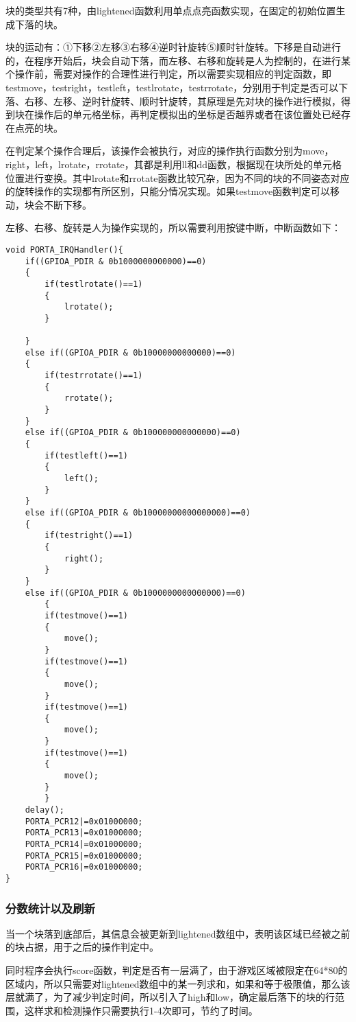 \documentclass[UTF8]{ctexart}
\begin{document}
块的类型共有7种，由lightened函数利用单点点亮函数实现，在固定的初始位置生成下落的块。

块的运动有：①下移②左移③右移④逆时针旋转⑤顺时针旋转。下移是自动进行的，在程序开始后，块会自动下落，而左移、右移和旋转是人为控制的，在进行某个操作前，需要对操作的合理性进行判定，所以需要实现相应的判定函数，即testmove，testright，testleft，testlrotate，testrrotate，分别用于判定是否可以下落、右移、左移、逆时针旋转、顺时针旋转，其原理是先对块的操作进行模拟，得到块在操作后的单元格坐标，再判定模拟出的坐标是否越界或者在该位置处已经存在点亮的块。

在判定某个操作合理后，该操作会被执行，对应的操作执行函数分别为move，right，left，lrotate，rrotate，其都是利用ll和dd函数，根据现在块所处的单元格位置进行变换。其中lrotate和rrotate函数比较冗杂，因为不同的块的不同姿态对应的旋转操作的实现都有所区别，只能分情况实现。如果testmove函数判定可以移动，块会不断下移。

左移、右移、旋转是人为操作实现的，所以需要利用按键中断，中断函数如下：
\begin{lstlisting}
void PORTA_IRQHandler(){
	if((GPIOA_PDIR & 0b1000000000000)==0)
	{
		if(testlrotate()==1)
		{
			lrotate();
		}

	}
	else if((GPIOA_PDIR & 0b10000000000000)==0)
	{
		if(testrrotate()==1)
		{
			rrotate();
		}
	}
	else if((GPIOA_PDIR & 0b100000000000000)==0)
	{
		if(testleft()==1)
		{
			left();
		}
	}
	else if((GPIOA_PDIR & 0b10000000000000000)==0)
	{
		if(testright()==1)
		{
			right();
		}
	}
	else if((GPIOA_PDIR & 0b1000000000000000)==0)
		{
		if(testmove()==1)
		{
			move();
		}
		if(testmove()==1)
		{
			move();
		}
		if(testmove()==1)
		{
			move();
		}
		if(testmove()==1)
		{
			move();
		}
		}
	delay();
	PORTA_PCR12|=0x01000000;
	PORTA_PCR13|=0x01000000;
	PORTA_PCR14|=0x01000000;
	PORTA_PCR15|=0x01000000;
	PORTA_PCR16|=0x01000000;
}
\end{lstlisting}

\subsubsection{分数统计以及刷新}
当一个块落到底部后，其信息会被更新到lightened数组中，表明该区域已经被之前的块占据，用于之后的操作判定中。

同时程序会执行score函数，判定是否有一层满了，由于游戏区域被限定在64*80的区域内，所以只需要对lightened数组中的某一列求和，如果和等于极限值，那么该层就满了，为了减少判定时间，所以引入了high和low，确定最后落下的块的行范围，这样求和检测操作只需要执行1-4次即可，节约了时间。
\end{document}
